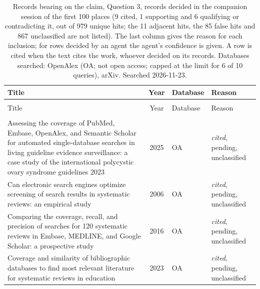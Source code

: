 
\begingroup\footnotesize
\begin{longtable}{@{}%
  >{\raggedright\arraybackslash}p{}c%
  >{\raggedright\arraybackslash}p{}%
  >{\raggedright\arraybackslash}p{}@{}}
\caption{Records bearing on the claim, Question 3, records decided in the companion session of the first 100 places (9 cited, 1 supporting and 6 qualifying or contradicting it, out of 979 unique hits; the 11 adjacent hits, the 85 false hits and 867 unclassified are not listed). The last column gives the reason for each inclusion; for rows decided by an agent the agent's confidence is given. A row is cited when the text cites the work, whoever decided on its records. Databases searched: OpenAlex (OA; not open access; capped at the limit for 6 of 10 queries), arXiv. Searched 2026-11-23.}\label{tab:screenlit-q3-top}\\
\toprule
Title & Year & Database & Reason \\
\midrule
\endfirsthead
\multicolumn{4}{@{}l}{\emph{\tablename~\thetable{} (cont.)}}\\
\toprule
Title & Year & Database & Reason \\
\midrule
\endhead
\midrule \multicolumn{4}{r@{}}{\emph{continued on next page}}\\
\endfoot
\bottomrule
\endlastfoot
Assessing the coverage of PubMed, Embase, OpenAlex, and Semantic Scholar for automated single-database searches in living guideline evidence surveillance: a case study of the international polycystic ovary syndrome guidelines 2023 & 2025 & OA & \emph{cited}, pending, unclassified \\
Can electronic search engines optimize screening of search results in systematic reviews: an empirical study & 2006 & OA & \emph{cited}, pending, unclassified \\
Comparing the coverage, recall, and precision of searches for 120 systematic reviews in Embase, MEDLINE, and Google Scholar: a prospective study & 2016 & OA & \emph{cited}, pending, unclassified \\
Coverage and similarity of bibliographic databases to find most relevant literature for systematic reviews in education & 2023 & OA & \emph{cited}, pending, unclassified \\

\end{longtable}
